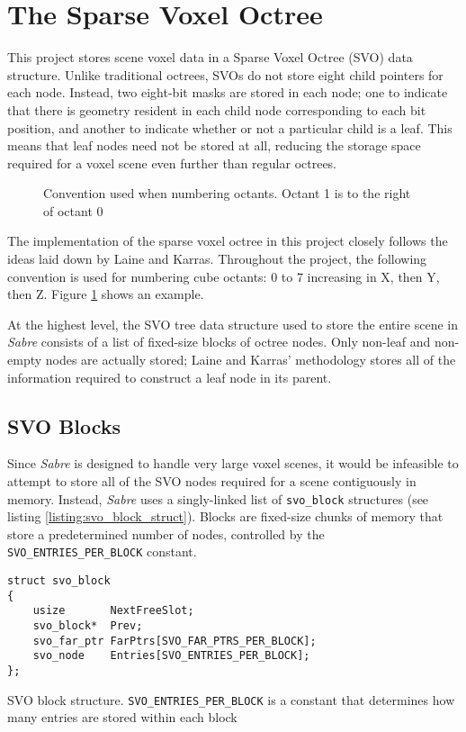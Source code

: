 \section{The Sparse Voxel Octree}
This project stores scene voxel data in a Sparse Voxel Octree (SVO) data structure. Unlike traditional octrees, SVOs do not store eight child pointers for each node. Instead, two eight-bit masks are stored in each node; one to indicate that there is geometry resident in each child node corresponding to each bit position, and another to indicate whether or not a particular child is a leaf. This means that leaf nodes need not be stored at all, reducing the storage space required for a voxel scene even further than regular octrees.

\begin{figure}[ht]
    \centering
    \footnotesize
    
    \caption{Convention used when numbering octants. Octant 1 is to the right of octant 0}
    \label{fig:octants_example}
\end{figure}

The implementation of the sparse voxel octree in this project closely follows the ideas laid down by Laine and Karras. Throughout the project, the following convention is used for numbering cube octants: 0 to 7 increasing in X, then Y, then Z. Figure \ref{fig:octants_example} shows an example.

At the highest level, the SVO tree data structure used to store the entire scene in \textit{Sabre} consists of a list of fixed-size blocks of octree nodes. Only non-leaf and non-empty nodes are actually stored; Laine and Karras' methodology stores all of the information required to construct a leaf node in its parent.

\subsection{SVO Blocks}\label{sec:svo_blocks}
Since \textit{Sabre} is designed to handle very large voxel scenes, it would be infeasible to attempt to store all of the SVO nodes required for a scene contiguously in memory. Instead, \textit{Sabre} uses a singly-linked list of \texttt{svo\_block} structures (see listing \ref{listing:svo_block_struct}). Blocks are fixed-size chunks of memory that store a predetermined number of nodes, controlled by the \texttt{SVO\_ENTRIES\_PER\_BLOCK} constant. 

\begin{listing}[ht]
\begin{verbatim}
struct svo_block
{
    usize       NextFreeSlot;
    svo_block*  Prev;
    svo_far_ptr FarPtrs[SVO_FAR_PTRS_PER_BLOCK];
    svo_node    Entries[SVO_ENTRIES_PER_BLOCK];
};
\end{verbatim}
\caption{SVO block structure. \texttt{SVO_ENTRIES_PER_BLOCK} is a constant that determines how many entries are stored within each block}
\label{listing:svo_block_struct}
\end{listing}

